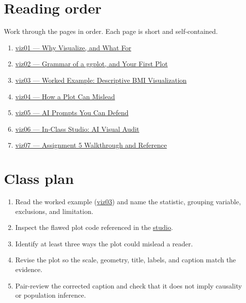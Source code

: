 \documentclass[
  letterpaper,
  DIV=11,
  numbers=noendperiod,
  oneside]{scrreprt}
\providecommand{\tightlist}{%
  \setlength{\itemsep}{0pt}\setlength{\parskip}{0pt}}
\begin{document}
\section*{Reading order}\label{reading-order}


Work through the pages in order. Each page is short and self-contained.

\begin{enumerate}
\def\labelenumi{\arabic{enumi}.}
\tightlist
\item
  \href{viz01-overview-and-goals.qmd}{viz01 --- Why Visualize, and What
  For}
\item
  \href{viz02-grammar-and-first-plot.qmd}{viz02 --- Grammar of a ggplot,
  and Your First Plot}
\item
  \href{viz03-worked-example.qmd}{viz03 --- Worked Example: Descriptive
  BMI Visualization}
\item
  \href{viz04-misleading-design.qmd}{viz04 --- How a Plot Can Mislead}
\item
  \href{viz05-ai-prompts-and-audit.qmd}{viz05 --- AI Prompts You Can
  Defend}
\item
  \href{viz06-studio-visual-audit.qmd}{viz06 --- In-Class Studio: AI
  Visual Audit}
\item
  \href{viz07-assignment-a5-and-reference.qmd}{viz07 --- Assignment 5
  Walkthrough and Reference}
\end{enumerate}

\section*{Class plan}\label{class-plan}


\begin{enumerate}
\def\labelenumi{\arabic{enumi}.}
\tightlist
\item
  Read the worked example (\href{viz03-worked-example.qmd}{viz03}) and
  name the statistic, grouping variable, exclusions, and limitation.
\item
  Inspect the flawed plot code referenced in the
  \href{viz06-studio-visual-audit.qmd}{studio}.
\item
  Identify at least three ways the plot could mislead a reader.
\item
  Revise the plot so the scale, geometry, title, labels, and caption
  match the evidence.
\item
  Pair-review the corrected caption and check that it does not imply
  causality or population inference.
\end{enumerate}
\end{document}
